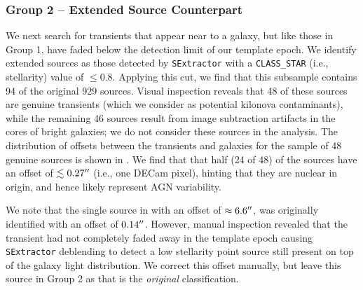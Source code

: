 \subsubsection{Group 2 -- Extended Source Counterpart}
\label{sec:ch3_group2}
We next search for transients that appear near to a galaxy, but like those in Group 1, have faded below the detection limit of our template epoch. We identify extended sources as those detected by {\tt SExtractor} with a {\tt CLASS\_STAR} (i.e., stellarity) value of $\le 0.8$. Applying this cut, we find that this subsample contains 94 of the original 929 sources. Visual inspection reveals that 48 of these sources are genuine transients (which we consider as potential kilonova contaminants), while the remaining 46 sources result from image subtraction artifacts in the cores of bright galaxies; we do not consider these sources in the analysis. The distribution of offsets between the transients and galaxies for the sample of 48 genuine sources is shown in . We find that that half (24 of 48) of the sources have an offset of $\lesssim 0.27\hbox{$^{\prime\prime}$}$ (i.e., one DECam pixel), hinting that they are nuclear in origin, and hence likely represent AGN variability.

We note that the single source in  with an offset of $\approx6.6\hbox{$^{\prime\prime}$}$, was originally identified with an offset of $0.14\hbox{$^{\prime\prime}$}$. However, manual inspection revealed that the transient had not completely faded away in the template epoch causing {\tt SExtractor} deblending to detect a low stellarity point source still present on top of the galaxy light distribution. We correct this offset manually, but leave this source in Group 2 as that is the {\it original} classification.

